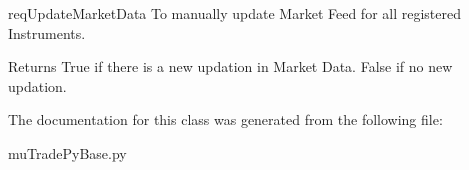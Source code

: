 req\-Update\-Market\-Data To manually update Market Feed for all registered Instruments. 

\begin{DoxyReturn}{Returns}
True if there is a new updation in Market Data. False if no new updation. 
\end{DoxyReturn}


The documentation for this class was generated from the following file\-:\begin{DoxyCompactItemize}
\item 
mu\-Trade\-Py\-Base.\-py\end{DoxyCompactItemize}
